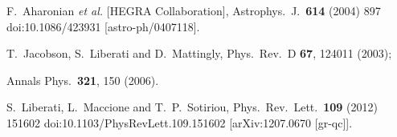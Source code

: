 \documentclass[12pt]{article}
\begin{document}
\begin{thebibliography}{99}

  F.~Aharonian {\it et al.} [HEGRA Collaboration],
  Astrophys.\ J.\  {\bf 614} (2004) 897
  doi:10.1086/423931
  [astro-ph/0407118].



  T.~Jacobson, S.~Liberati and D.~Mattingly,
  Phys.\ Rev.\ D {\bf 67}, 124011 (2003);

  Annals Phys.\  {\bf 321}, 150 (2006).






  S.~Liberati, L.~Maccione and T.~P.~Sotiriou,
  Phys.\ Rev.\ Lett.\  {\bf 109} (2012) 151602
  doi:10.1103/PhysRevLett.109.151602
  [arXiv:1207.0670 [gr-qc]].




\end{thebibliography}
\end{document}
